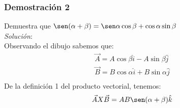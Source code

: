 \documentclass[12pt,openany]{book}
\begin{document}
			\subsubsection{Demostraci\'on 2}
				\noindent Demuestra que $\sen(\alpha+\beta)=\sen\alpha\cos\beta+\cos\alpha\sin\beta$\\
				\noindent\textsl{Soluci\'on}:\\
				Observando el dibujo sabemos que:
				\begin{equation*}
					\begin{split}
						\vec{A}=A\cos\beta\hat{i}-A\sin\beta\hat{j}    \\
						\vec{B}=B\cos\alpha\hat{i}+B\sin\alpha\hat{j}  \\
					\end{split}
				\end{equation*}
				De la definici\'on 1 del producto vectorial, tenemos:\\
				\begin{equation}
					\begin{split}
						\vec{A}X\vec{B}=AB\sen(\alpha+\beta)\hat{k}
					\end{split}
					\label{Def_1}
				\end{equation}
\end{document}
